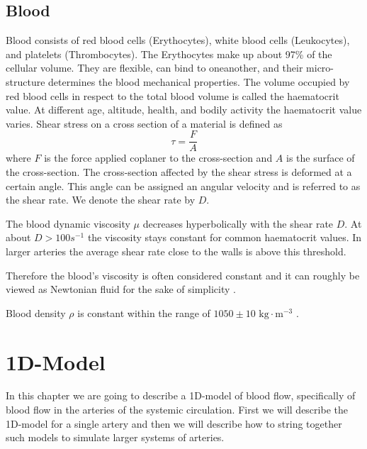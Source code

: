 \documentclass[a4paper, oneside]{discothesis}
\begin{document}
\section{Blood} \label{b}

Blood consists of red blood cells (Erythocytes), white blood cells (Leukocytes), and platelets (Thrombocytes).
The Erythocytes make up about 97\% of the cellular volume.
They are flexible, can bind to oneanother, and their micro-structure determines the blood mechanical properties.
The volume occupied by red blood cells in respect to the total blood volume is called the haematocrit value.
At different age, altitude, health, and bodily activity the haematocrit value varies.
Shear stress on a cross section of a material is defined as 
\begin{equation}
	\tau = \frac{F}{A}
\end{equation}
where $F$ is the force applied coplaner to the cross-section and $A$ is the surface of the cross-section.
The cross-section affected by the shear stress is deformed at a certain angle. 
This angle can be assigned an angular velocity and is referred to as the shear rate.
We denote the shear rate by $D$. \cite{köppl2023dimension}

The blood dynamic viscosity $\mu$ decreases hyperbolically with the shear rate $D$.
At about $D > 100s^{-1}$ the viscosity stays constant for common haematocrit values.
In larger arteries the average shear rate close to the walls is above this threshold. \cite{MCDbook}

Therefore the blood's viscosity is often considered constant and it can roughly be viewed as Newtonian fluid for the sake of simplicity \cite{fung1996biomechanics} \cite{guyton2006textbook} \cite{MCDbook} \cite{pedley_1980} \cite{zamir2000physics} \cite{zamir2006physics}.

Blood density $\rho$ is constant within the range of $1050 \pm 10 \text{ kg}\cdot\text{m}^{-3}$ \cite{PMID:2658951} \cite{kenner1977continuous}.


\chapter{1D-Model} \label{chap:1dm}
In this chapter we are going to describe a 1D-model of blood flow, specifically of blood flow in the arteries of the systemic circulation.
First we will describe the 1D-model for a single artery and then we will describe how to string together such models to simulate larger systems of arteries.
\end{document}
